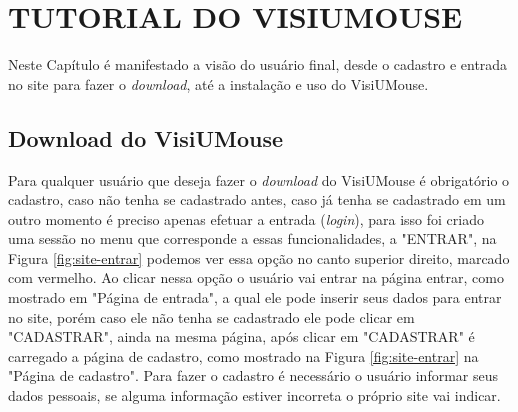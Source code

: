 


\chapter{TUTORIAL DO VISIUMOUSE}\label{CAP-tecnologia-visiumouse}
Neste Capítulo é manifestado a visão do usuário final, desde o cadastro e entrada no site para fazer o \textit{download}, até a instalação e uso do VisiUMouse. 

\section{Download do VisiUMouse}
Para qualquer usuário que deseja fazer o \textit{download} do VisiUMouse é obrigatório o cadastro, caso não tenha se cadastrado antes, caso já tenha se cadastrado em um outro momento é preciso apenas efetuar a entrada (\textit{login}), para isso foi criado uma sessão no menu que corresponde a essas funcionalidades, a "ENTRAR", na Figura \ref{fig:site-entrar} podemos ver essa opção no canto superior direito, marcado com vermelho. Ao clicar nessa opção o usuário vai entrar na página entrar, como mostrado em "Página de entrada", a qual ele pode inserir seus dados para entrar no site, porém caso ele não tenha se cadastrado ele pode clicar em "CADASTRAR", ainda na mesma página, após clicar em "CADASTRAR" é carregado a página de cadastro, como mostrado na Figura \ref{fig:site-entrar} na "Página de cadastro". Para fazer o cadastro é necessário o usuário informar seus dados pessoais, se alguma informação estiver incorreta o próprio site vai indicar. 

